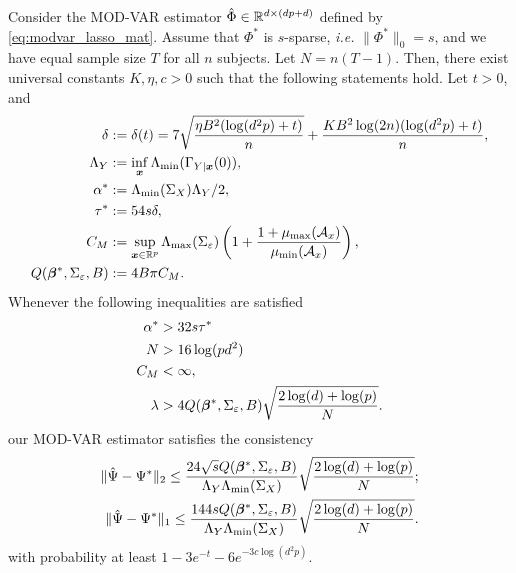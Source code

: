 \newpage
\begin{thm*}
    Consider the MOD-VAR estimator $\hat\Phi\in\mathbb{R}^{d\times (dp+d)}$ defined by \eqref{eq:modvar_lasso_mat}. Assume that $\Phi^*$ is $s$-sparse, \textit{i.e.} $\|\Phi^*\|_0 = s$, and we have equal sample size $T$ for all $n$ subjects. Let $N = n(T-1)$. Then, there exist universal constants $K,\eta , c > 0$ such that the following statements hold. Let $t>0$, and 
    \begin{align*}
        \delta&:= \delta(t) =  7\sqrt{\frac{\eta B^2(\log(d^2p) + t)}{ n} } + \frac{  K B^2\log(2n)(\log(d^2p) + t) }{n},\\
        \Lambda_{Y} &:=  \inf_{\bm{x}} \Lambda_{\min}(\Gamma_{Y|\bm{x}}(0)),\\
        \alpha^* &:= \Lambda_{\min}(\Sigma_X) \Lambda_{Y} / 2, \\
        \tau^* &:= 54s\delta ,\\
        C_M &:= \sup_{\bm{x}\in\mathbb{R}^p}  \Lambda_{\max}(\Sigma_\varepsilon) \left( 1 + \frac{1 + \mu_{\max}(\mathcal{A}_x)} {\mu_{\min}(\mathcal{A}_x)} \right) ,\\
        Q(\bm{\beta}^*, \Sigma_\varepsilon, B) &:= 4B \pi C_M.
    \end{align*}
    Whenever the following inequalities are satisfied
    \begin{align}
        \alpha^* &> 32s \tau^*  \label{eq:thm1_re_cond} \\
        N &> 16\log(pd^2) \label{eq:thm1_errorbound_cond1}\\
        C_M &< \infty, \label{eq:thm1_errorbound_cond2}\\
        \lambda &> 4Q(\bm{\beta}^*, \Sigma_\varepsilon, B) \sqrt{\frac{2\log(d) + \log(p)}{N}} \label{eq:thm1_lambda_cond}.
    \end{align}
    our MOD-VAR estimator satisfies the consistency 
    \begin{align*}
        \|\hat\Psi - \Psi^* \|_2  \leq \frac{24\sqrt{s} Q(\bm{\beta}^*, \Sigma_\varepsilon, B)}{\Lambda_{Y}\Lambda_{\min}(\Sigma_X)}  \sqrt{\frac{2\log(d) + \log(p)}{N}};\\
        \| \hat\Psi - \Psi^*\|_1 \leq  \frac{144 s Q(\bm{\beta}^*, \Sigma_\varepsilon, B)}{\Lambda_{Y} \Lambda_{\min}(\Sigma_X)}  \sqrt{\frac{2\log(d) + \log(p)}{N}}.
    \end{align*}
    with probability at least $1 - 3e^{-t} - 6e^{-3c\log(d^2p)}$.
\end{thm*}
